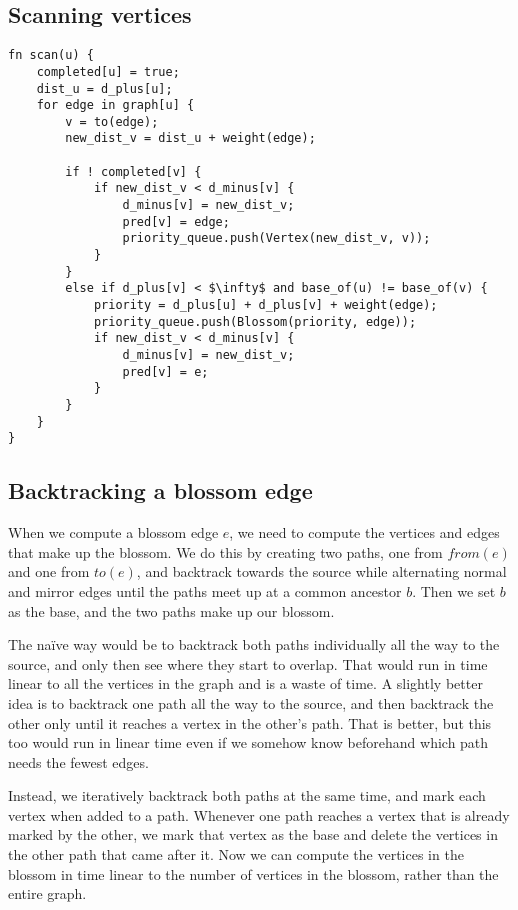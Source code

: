 \subsection{Scanning vertices}
\begin{lstlisting}[caption={Scan},label=Listing,mathescape=true]
fn scan(u) {
    completed[u] = true;
    dist_u = d_plus[u];
    for edge in graph[u] {
        v = to(edge);
        new_dist_v = dist_u + weight(edge);

        if ! completed[v] {
            if new_dist_v < d_minus[v] {
                d_minus[v] = new_dist_v;
                pred[v] = edge;
                priority_queue.push(Vertex(new_dist_v, v));
            }
        }
        else if d_plus[v] < $\infty$ and base_of(u) != base_of(v) {
            priority = d_plus[u] + d_plus[v] + weight(edge);
            priority_queue.push(Blossom(priority, edge));
            if new_dist_v < d_minus[v] {
                d_minus[v] = new_dist_v;
                pred[v] = e;
            }
        }
    }
}
\end{lstlisting}

\subsection{Backtracking a blossom edge}
\label{subsection:backtracking-blossom-edges}
When we compute a blossom edge $e$, we need to compute the vertices and edges that make up the blossom. We do this by creating two paths, one from $from(e)$ and one from $to(e)$, and backtrack towards the source while alternating normal and mirror edges until the paths meet up at a common ancestor $b$. Then we set $b$ as the base, and the two paths make up our blossom.

The naïve way would be to backtrack both paths individually all the way to the source, and only then see where they start to overlap. That would run in time linear to all the vertices in the graph and is a waste of time. A slightly better idea is to backtrack one path all the way to the source, and then backtrack the other only until it reaches a vertex in the other's path. That is better, but this too would run in linear time even if we somehow know beforehand which path needs the fewest edges.

Instead, we iteratively backtrack both paths at the same time, and mark each vertex when added to a path. Whenever one path reaches a vertex that is already marked by the other, we mark that vertex as the base and delete the vertices in the other path that came after it. Now we can compute the vertices in the blossom in time linear to the number of vertices in the blossom, rather than the entire graph.

